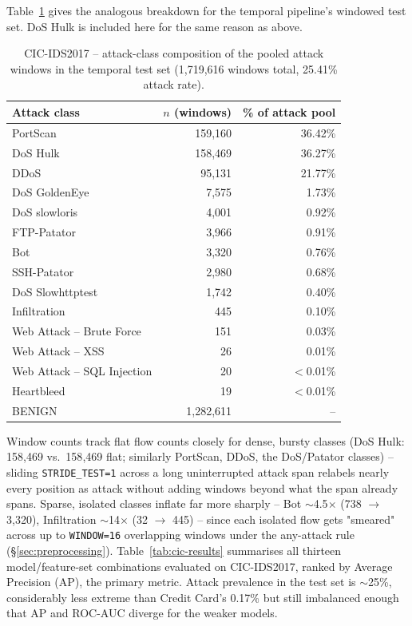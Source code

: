 Table~\ref{tab:cic-composition-temporal} gives the analogous breakdown for the temporal pipeline's windowed test set. DoS Hulk is included here for the same reason as above.

\begin{table}[h]
\centering
\begin{tabular}{@{}lrr@{}}
\toprule
Attack class & $n$ (windows) & \% of attack pool \\
\midrule
PortScan            & 159{,}160 & 36.42\% \\
DoS Hulk            & 158{,}469 & 36.27\% \\
DDoS                & 95{,}131  & 21.77\% \\
DoS GoldenEye       & 7{,}575   & 1.73\%  \\
DoS slowloris       & 4{,}001   & 0.92\%  \\
FTP-Patator         & 3{,}966   & 0.91\%  \\
Bot                 & 3{,}320   & 0.76\%  \\
SSH-Patator         & 2{,}980   & 0.68\%  \\
DoS Slowhttptest    & 1{,}742   & 0.40\%  \\
Infiltration        & 445       & 0.10\%  \\
Web Attack -- Brute Force & 151 & 0.03\%  \\
Web Attack -- XSS    & 26        & 0.01\%  \\
Web Attack -- SQL Injection & 20 & $<$0.01\% \\
Heartbleed          & 19        & $<$0.01\% \\
\midrule
BENIGN              & 1{,}282{,}611 & -- \\
\bottomrule
\end{tabular}
\caption{CIC-IDS2017 -- attack-class composition of the pooled attack windows in the temporal test set (1{,}719{,}616 windows total, 25.41\% attack rate).}
\label{tab:cic-composition-temporal}
\end{table}

Window counts track flat flow counts closely for dense, bursty classes (DoS Hulk: 158{,}469 vs.\ 158{,}469 flat; similarly PortScan, DDoS, the DoS/Patator classes) -- sliding \texttt{STRIDE\_TEST=1} across a long uninterrupted attack span relabels nearly every position as attack without adding windows beyond what the span already spans. Sparse, isolated classes inflate far more sharply -- Bot $\sim$4.5$\times$ (738 $\to$ 3{,}320), Infiltration $\sim$14$\times$ (32 $\to$ 445) -- since each isolated flow gets "smeared" across up to \texttt{WINDOW=16} overlapping windows under the any-attack rule (\S\ref{sec:preprocessing}).
Table~\ref{tab:cic-results} summarises all thirteen model/feature-set combinations evaluated on CIC-IDS2017, ranked by Average Precision (AP), the primary metric. Attack prevalence in the test set is $\sim$25\%, considerably less extreme than Credit Card's 0.17\% but still imbalanced enough that AP and ROC-AUC diverge for the weaker models.

